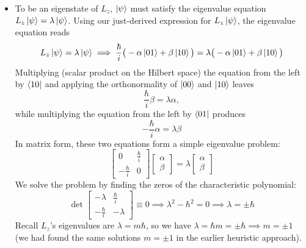 \documentclass[11pt, a4paper]{article}
\begin{document}
\begin{itemize}
	\item To be an eigenstate of $ L_{z} $, $ \ket{\psi} $ must satisfy the eigenvalue equation $ L_{z}\ket{\psi} = \lambda \ket{\psi}  $. Using our just-derived expression for $ L_{z}\ket{\psi}  $, the eigenvalue equation reads
	\begin{equation*}
		L_{z}\ket{\psi} = \lambda \ket{\psi} \implies \frac{\hbar}{i}\big(-\alpha \ket{01} + \beta \ket{10}\big) = \lambda \big(-\alpha \ket{01} + \beta \ket{10}\big)
	\end{equation*}
	Multiplying (scalar product on the Hilbert space) the equation from the left by $ \bra{10} $ and applying the orthonormality of $ \ket{00} $ and $ \ket{10} $ leaves
	\begin{equation*}
		\frac{\hbar}{i}\beta = \lambda \alpha,
	\end{equation*}
	while multiplying the equation from the left by $ \bra{01} $ produces
	\begin{equation*}
		-\frac{\hbar}{i}\alpha = \lambda \beta
	\end{equation*}
	In matrix form, these two equations form a simple eigenvalue problem:
	\begin{equation*}
		\begin{bmatrix}
			0 & \frac{\hbar}{i}\\
			-\frac{\hbar}{i} & 0
		\end{bmatrix}
		\begin{bmatrix}
			\alpha\\
			\beta
		\end{bmatrix}
		= \lambda
		\begin{bmatrix}
			\alpha\\
			\beta
		\end{bmatrix}
	\end{equation*}
	We solve the problem by finding the zeros of the characteristic polynomial:
	\begin{equation*}
		\det 
		\begin{bmatrix}
			-\lambda & \frac{\hbar}{i}\\
			-\frac{\hbar}{i} & -\lambda
		\end{bmatrix} \equiv 0 \implies \lambda^{2} - \hbar^{2} = 0 \implies \lambda = \pm \hbar
	\end{equation*}
	Recall $ L_{z} $'s eigenvalues are $ \lambda = m \hbar $, so we have  $ \lambda = \hbar m = \pm \hbar \implies m = \pm 1$ (we had found the same solutions $ m = \pm 1 $ in the earlier heuristic approach). 
	

\end{itemize}
\end{document}
